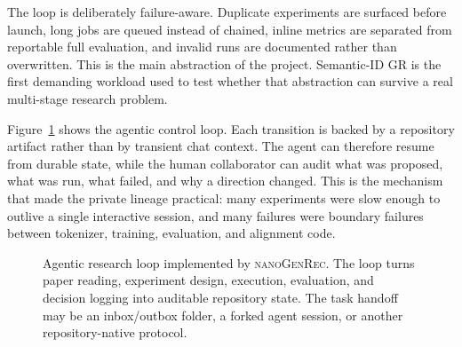 \documentclass[11pt]{article}
\begin{document}
The loop is deliberately failure-aware. Duplicate experiments are surfaced before launch, long jobs are queued instead of chained, inline metrics are separated from reportable full evaluation, and invalid runs are documented rather than overwritten. This is the main abstraction of the project. Semantic-ID GR is the first demanding workload used to test whether that abstraction can survive a real multi-stage research problem.

Figure~\ref{fig:agentic-loop} shows the agentic control loop. Each transition is backed by a repository artifact rather than by transient chat context. The agent can therefore resume from durable state, while the human collaborator can audit what was proposed, what was run, what failed, and why a direction changed. This is the mechanism that made the private lineage practical: many experiments were slow enough to outlive a single interactive session, and many failures were boundary failures between tokenizer, training, evaluation, and alignment code.

\begin{figure}[t]
\centering
{}
\caption{Agentic research loop implemented by \textsc{nanoGenRec}. The loop turns paper reading, experiment design, execution, evaluation, and decision logging into auditable repository state. The task handoff may be an inbox/outbox folder, a forked agent session, or another repository-native protocol.}
\label{fig:agentic-loop}
\end{figure}
\end{document}
